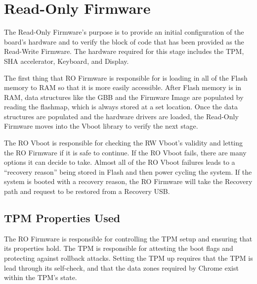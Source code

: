 \documentclass[../report.tex]{subfiles}
\begin{document}
\onehalfspacing


\section{Read-Only Firmware}

The Read-Only Firmware's purpose is to provide an initial configuration of the board's hardware and to verify the block of code that has been provided as the Read-Write Firmware.
The hardware required for this stage includes the TPM, SHA accelerator, Keyboard, and Display.

The first thing that RO Firmware is responsible for is loading in all of the Flash memory to RAM so that it is more easily accessible. 
After Flash memory is in RAM, data structures like the GBB and the Firmware Image are populated by reading the flashmap, which is always stored at a set location.
Once the data structures are populated and the hardware drivers are loaded, the Read-Only Firmware moves into the Vboot library to verify the next stage.

The RO Vboot is responsible for checking the RW Vboot's validity and letting the RO Firmware if it is safe to continue.
If the RO Vboot fails, there are many options it can decide to take.
Almost all of the RO Vboot failures leads to a ``recovery reason'' being stored in Flash and then power cycling the system.
If the system is booted with a recovery reason, the RO Firmware will take the Recovery path and request to be restored from a Recovery USB\@. %

\subsection{TPM Properties Used}

The RO Firmware is responsible for controlling the TPM setup and ensuring that its properties hold. 
The TPM is responsible for attesting the boot flags and protecting against rollback attacks. 
Setting the TPM up requires that the TPM is lead through its self-check, and that the data zones required by Chrome exist within the TPM's state.
\end{document}
